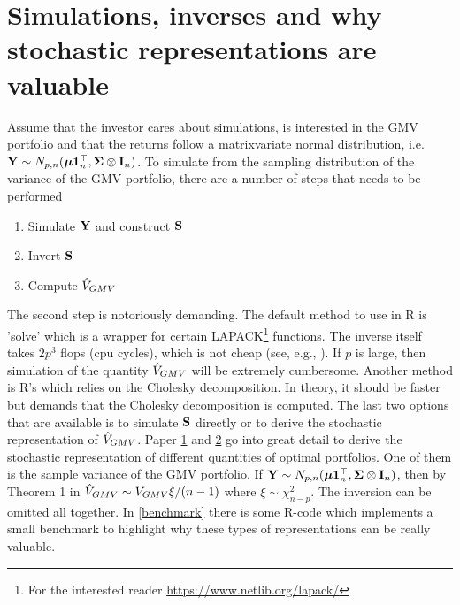 \documentclass[12pt, oneside]{book}\usepackage{knitr}
\begin{document}
{\section{Simulations, inverses and why stochastic representations are valuable}
Assume that the investor cares about simulations, is interested in the GMV portfolio and that the returns follow a matrixvariate normal distribution, i.e. $\mathbf{Y} \sim N_{p,n}(\mbox{\boldmath$\mu$} \mathbf{1}_n^\top, \mathbf{\Sigma} \otimes \mathbf{I}_n)$. 
To simulate from the sampling distribution of the variance of the GMV portfolio, there are a number of steps that needs to be performed
\begin{enumerate}
  \item Simulate $\mathbf{Y}$ and construct $\mathbf{S}$
  \item Invert $\mathbf{S}$
  \item Compute $\hat{V}_{GMV}$
\end{enumerate}
The second step is notoriously demanding.
The default method to use in R is 'solve' which is a wrapper for certain LAPACK\footnote{For the interested reader \url{https://www.netlib.org/lapack/}} functions.
The inverse itself takes $2p^3$ flops (cpu cycles), which is not cheap (see, e.g., \citet[ch 14]{higham2002accuracy}).
If $p$ is large, then simulation of the quantity $\hat{V}_{GMV}$ will be extremely cumbersome.
Another method is R's  which relies on the Cholesky decomposition. 
In theory, it should be faster but demands that the Cholesky decomposition is computed.
The last two options that are available is to simulate $\mathbf{S}$ directly or to derive the stochastic representation of $\hat{V}_{GMV}$.
Paper \hyperref[sec:paper1]{1} and \hyperref[sec:paper2]{2} go into great detail to derive the stochastic representation of different quantities of optimal portfolios. 
One of them is the sample variance of the GMV portfolio.
If $\mathbf{Y} \sim N_{p,n}(\mbox{\boldmath$\mu$} \mathbf{1}_n^\top, \mathbf{\Sigma} \otimes \mathbf{I}_n)$, then by Theorem 1 in \citet{bodnar2020sampling} $\hat{V}_{GMV} \sim V_{GMV}\xi /(n-1)$ where $\xi \sim \chi^2_{n-p}$.
The inversion can be omitted all together.
In \ref{benchmark} there is some R-code which implements a small benchmark to highlight why these types of representations can be really valuable.
\begin{knitrout}\small
{}\color{fgcolor}\begin{kframe}
\label{benchmark}\begin{alltt}
 \hlkwb{<-} 

\end{alltt}
\end{kframe}
\end{knitrout}}
\end{document}
